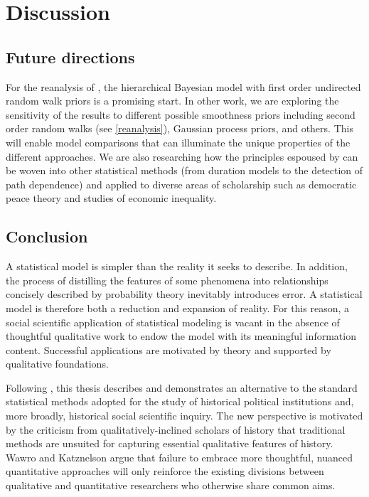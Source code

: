 \chapter{Discussion}
\label{discussion}

\section{Future directions}

For the reanalysis of , the hierarchical Bayesian model with first order 
undirected random walk priors is a promising start. In other work, we are exploring the sensitivity of the 
results to different possible smoothness priors including second order random walks (see \ref{reanalysis}), 
Gaussian process priors, and others. This will enable model comparisons that can 
illuminate the unique properties of the different approaches. We are also researching 
how the principles espoused by  can be woven into other statistical 
methods (from duration models to the detection of path dependence) and applied to diverse areas
of scholarship such as democratic peace theory and studies of economic inequality. 
 

\section{Conclusion}

A statistical model is simpler than the reality it seeks to describe. In addition, the 
process of distilling the features of some phenomena into relationships concisely 
described by probability theory inevitably introduces error. A statistical model is 
therefore both a reduction and expansion of reality. For this reason, a social scientific 
application of statistical modeling is vacant in the absence of thoughtful qualitative 
work to endow the model with its meaningful information content. Successful 
applications are motivated by theory and supported by qualitative foundations. 

Following , this thesis describes and demonstrates 
an alternative to the standard statistical methods adopted for the study of historical 
political institutions and, more broadly, historical social scientific inquiry. The new perspective is 
motivated by the criticism from qualitatively-inclined scholars of history that traditional methods 
are unsuited for capturing essential qualitative features of history. 
Wawro and Katznelson argue that failure to embrace more thoughtful, nuanced quantitative 
approaches will only reinforce the existing divisions between qualitative and quantitative 
researchers who otherwise share common aims. 

